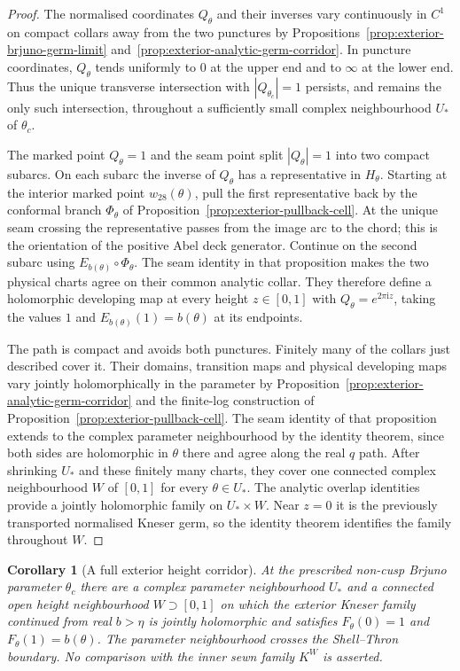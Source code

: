 \documentclass[11pt]{amsart}
\newtheorem{corollary}[theorem]{Corollary}
\theoremstyle{definition}
\newcommand{\Kk}{K}
\newcommand{\ii}{\mathrm{i}}
\begin{document}
\begin{proof}
The normalised coordinates $Q_\theta$ and their inverses vary
continuously in $C^1$ on compact collars away from the two
punctures by Propositions~\ref{prop:exterior-brjuno-germ-limit}
and~\ref{prop:exterior-analytic-germ-corridor}.  In puncture
coordinates, $Q_\theta$ tends uniformly to $0$ at the upper end
and to $\infty$ at the lower end.  Thus the unique transverse
intersection with $|Q_{\theta_c}|=1$ persists, and remains the
only such intersection, throughout a sufficiently small complex
neighbourhood $U_*$ of $\theta_c$.

The marked point $Q_\theta=1$ and the seam point split
$|Q_\theta|=1$ into two compact subarcs.  On each subarc the
inverse of $Q_\theta$ has a representative in $H_\theta$.
Starting at the interior marked point $w_{28}(\theta)$, pull the
first representative back by the conformal branch $\Phi_\theta$ of
Proposition~\ref{prop:exterior-pullback-cell}.  At the unique seam
crossing the representative passes from the image arc to the chord;
this is the orientation of the positive Abel deck generator.
Continue on the second subarc using
$E_{b(\theta)}\circ\Phi_\theta$.  The seam identity in that proposition makes
the two physical charts agree on their common analytic collar.
They therefore define a holomorphic developing map at every height
$z\in[0,1]$ with $Q_\theta=e^{2\pi\ii z}$, taking the values $1$ and
$E_{b(\theta)}(1)=b(\theta)$ at its endpoints.

The path is compact and avoids both punctures.  Finitely many of the
collars just described cover it.  Their domains, transition maps
and physical developing maps vary jointly holomorphically in the
parameter by Proposition~\ref{prop:exterior-analytic-germ-corridor}
and the finite-log construction of
Proposition~\ref{prop:exterior-pullback-cell}.
The seam identity of that proposition extends to the complex
parameter neighbourhood by the identity theorem, since both sides
are holomorphic in $\theta$ there and agree along the real $q$ path.
After shrinking $U_*$ and these finitely many charts, they cover
one connected complex neighbourhood $W$ of $[0,1]$ for every
$\theta\in U_*$.  The analytic overlap identities provide a jointly
holomorphic family on $U_*\times W$.  Near $z=0$ it is the
previously transported normalised Kneser germ, so the identity
theorem identifies the family throughout $W$.
\end{proof}

\begin{corollary}[A full exterior height corridor]
\label{cor:exterior-full-height}
At the prescribed non-cusp Brjuno parameter $\theta_c$ there
are a complex parameter neighbourhood $U_*$ and a connected
open height neighbourhood $W\supset[0,1]$ on which the exterior
Kneser family continued from real $b>\eta$ is jointly holomorphic
and satisfies $F_\theta(0)=1$ and $F_\theta(1)=b(\theta)$.
The parameter neighbourhood crosses the Shell--Thron boundary.
No comparison with the inner sewn family $\Kk^W$ is asserted.
\end{corollary}
\end{document}
